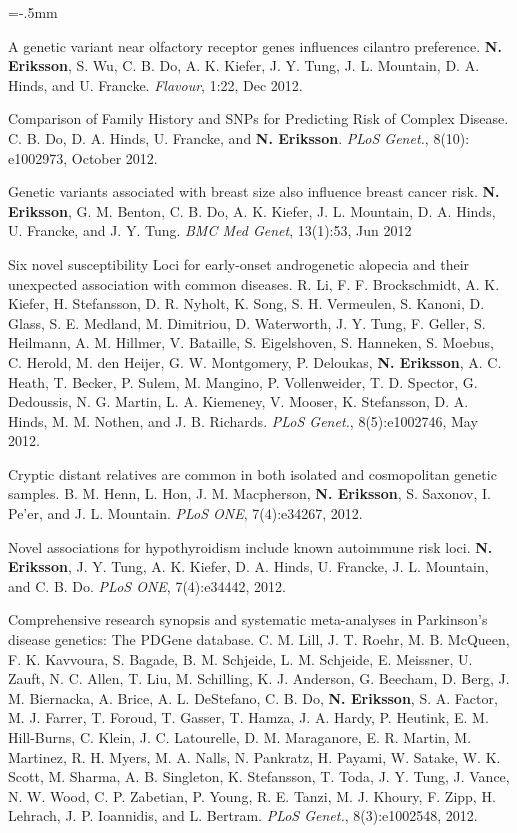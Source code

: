 \documentclass[11pt]{article}
\newenvironment{papers}[1][1]
	{\vspace{-2ex}\leftmargini=16.1mm%
	 \begin{revnumerate}[{#1}]\itemsep=-.5mm}
	{\end{revnumerate}\vspace{-2ex}}
\def\paper{\item}
\def\paperyear#1{\item[\addtocounter{enumi}{-1}%
		 {\makebox[0mm][r]{\makebox[14mm]{#1\hfill\arabic{enumi}.}}}]}
\begin{document}
\begin{papers}[29]
     
                \paperyear{2012}
        A genetic variant near olfactory receptor genes influences cilantro preference.
        \textbf{N. Eriksson}, S. Wu, C. B. Do, A. K. Kiefer, J. Y. Tung, J. L.  Mountain, D. A. Hinds, and U. Francke.
        \textit{Flavour}, 1:22, Dec 2012.

            \paper
        Comparison of Family History and SNPs for Predicting Risk of Complex Disease.
        C. B. Do, D. A. Hinds, U. Francke, and \textbf{N. Eriksson}.
        \textit{PLoS Genet.}, 8(10): e1002973, October 2012.

            \paper
        Genetic variants associated with breast size also influence breast cancer risk.
        \textbf{N. Eriksson}, G. M. Benton, C. B. Do, A. K. Kiefer, J. L. Mountain, D. A. Hinds, U. Francke, and J. Y. Tung.
        \textit{BMC Med Genet}, 13(1):53, Jun 2012

            \paper
        Six novel susceptibility Loci for early-onset androgenetic alopecia and their unexpected association with common diseases.
        R. Li, F. F. Brockschmidt, A. K. Kiefer, H. Stefansson, D. R. Nyholt, K. Song, S. H. Vermeulen, S. Kanoni, D. Glass, S. E. Medland, M. Dimitriou, D. Waterworth, J. Y. Tung, F. Geller, S. Heilmann, A. M. Hillmer, V. Bataille, S. Eigelshoven, S. Hanneken, S. Moebus, C. Herold, M. den Heijer, G. W. Montgomery, P. Deloukas, \textbf{N. Eriksson}, A. C. Heath, T. Becker, P. Sulem, M. Mangino, P. Vollenweider, T. D. Spector, G. Dedoussis, N. G.  Martin, L. A. Kiemeney, V. Mooser, K. Stefansson, D. A. Hinds, M. M. Nothen, and J. B. Richards.
        \textit{PLoS Genet.}, 8(5):e1002746, May 2012.

            \paper
        Cryptic distant relatives are common in both isolated and cosmopolitan genetic samples.
        B. M. Henn, L. Hon, J. M. Macpherson, \textbf{N. Eriksson}, S. Saxonov, I. Pe'er, and J. L. Mountain.
        \textit{PLoS ONE}, 7(4):e34267, 2012.

            \paper
        Novel associations for hypothyroidism include known autoimmune risk loci.
        \textbf{N. Eriksson}, J. Y. Tung, A. K. Kiefer, D. A. Hinds, U. Francke, J. L. Mountain, and C. B. Do.
        \textit{PLoS ONE}, 7(4):e34442, 2012.

            \paper
        Comprehensive research synopsis and systematic meta-analyses in Parkinson's disease genetics: The PDGene database.
        C. M. Lill, J. T. Roehr, M. B. McQueen, F. K. Kavvoura, S. Bagade, B. M.  Schjeide, L. M. Schjeide, E. Meissner, U. Zauft, N. C. Allen, T. Liu, M. Schilling, K. J. Anderson, G. Beecham, D. Berg, J. M. Biernacka, A. Brice, A. L. DeStefano, C. B. Do, \textbf{N. Eriksson}, S. A. Factor, M. J. Farrer, T. Foroud, T. Gasser, T. Hamza, J. A. Hardy, P. Heutink, E. M. Hill-Burns, C. Klein, J. C. Latourelle, D. M. Maraganore, E. R. Martin, M. Martinez, R. H. Myers, M. A. Nalls, N. Pankratz, H. Payami, W. Satake, W. K. Scott, M. Sharma, A. B. Singleton, K. Stefansson, T. Toda, J. Y. Tung, J. Vance, N. W. Wood, C. P. Zabetian, P. Young, R. E. Tanzi, M. J. Khoury, F. Zipp, H. Lehrach, J. P. Ioannidis, and L. Bertram.
        \textit{PLoS Genet.}, 8(3):e1002548, 2012.


\end{papers}
\end{document}
